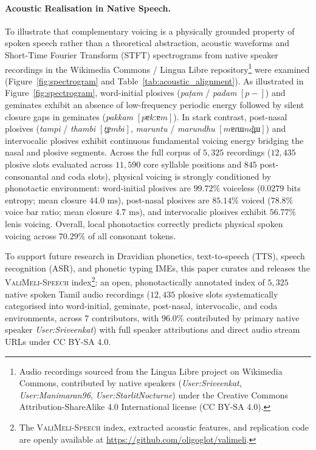 \documentclass[11pt]{article}
\begin{document}
\paragraph{Acoustic Realisation in Native Speech.}
To illustrate that complementary voicing is a physically grounded property of spoken speech rather than a theoretical abstraction, acoustic waveforms and Short-Time Fourier Transform (STFT) spectrograms from native speaker recordings in the Wikimedia Commons / Lingua Libre repository\footnote{Audio recordings sourced from the Lingua Libre project on Wikimedia Commons, contributed by native speakers (\textit{User:Sriveenkat}, \textit{User:Manimaran96}, \textit{User:StarlitNocturne}) under the Creative Commons Attribution-ShareAlike 4.0 International license (CC BY-SA 4.0).} were examined (Figure~\ref{fig:spectrogram} and Table~\ref{tab:acoustic_alignment}).
As illustrated in Figure~\ref{fig:spectrogram}, word-initial plosives (\textit{pa\d{t}am} / \textit{padam} $[p-]$) and geminates exhibit an absence of low-frequency periodic energy followed by silent closure gaps in geminates (\textit{pakkam} $[pɐkːɐm]$). In stark contrast, post-nasal plosives (\textit{tampi} / \textit{thambi} $[t̪ɐmbi]$, \textit{maruntu} / \textit{marundhu} $[mɐɾɯnd̪ɯ]$) and intervocalic plosives exhibit continuous fundamental voicing energy bridging the nasal and plosive segments. Across the full corpus of $5{,}325$ recordings ($12{,}435$ plosive slots evaluated across $11{,}590$ core syllable positions and $845$ post-consonantal and coda slots), physical voicing is strongly conditioned by phonotactic environment: word-initial plosives are $99.72\%$ voiceless ($0.0279$ bits entropy; mean closure $44.0\text{ ms}$), post-nasal plosives are $85.14\%$ voiced ($78.8\%$ voice bar ratio; mean closure $4.7\text{ ms}$), and intervocalic plosives exhibit $56.77\%$ lenis voicing. Overall, local phonotactics correctly predicts physical spoken voicing across $70.29\%$ of all consonant tokens.

To support future research in Dravidian phonetics, text-to-speech (TTS), speech recognition (ASR), and phonetic typing IMEs, this paper curates and releases the \textsc{ValiMeli-Speech} index\footnote{The \textsc{ValiMeli-Speech} index, extracted acoustic features, and replication code are openly available at \url{https://github.com/oligoglot/valimeli}.}: an open, phonotactically annotated index of $5{,}325$ native spoken Tamil audio recordings ($12{,}435$ plosive slots systematically categorised into word-initial, geminate, post-nasal, intervocalic, and coda environments, across 7 contributors, with $96.0\%$ contributed by primary native speaker \textit{User:Sriveenkat}) with full speaker attributions and direct audio stream URLs under CC BY-SA 4.0.
\end{document}
